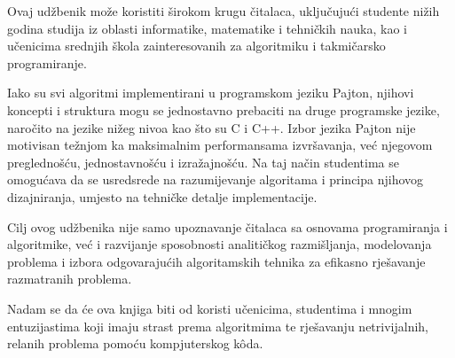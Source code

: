 \documentclass[b5paper, utf8, 11pt, colorlinks]{book}
\begin{document}
Ovaj udžbenik može koristiti širokom krugu čitalaca, uključujući studente nižih godina studija iz oblasti informatike, matematike i tehničkih nauka, kao i učenicima srednjih škola zainteresovanih za algoritmiku i takmičarsko programiranje.

Iako su svi algoritmi implementirani u programskom jeziku Pajton, njihovi koncepti i struktura mogu se jednostavno prebaciti na druge programske jezike, naročito na jezike nižeg nivoa kao što su C i C++. Izbor jezika Pajton nije motivisan težnjom ka maksimalnim performansama izvršavanja, već njegovom preglednošću, jednostavnošću i izražajnošću. Na taj način studentima se omogućava da se usredsrede na razumijevanje algoritama i principa njihovog dizajniranja, umjesto na tehničke detalje implementacije.

Cilj ovog udžbenika nije samo upoznavanje čitalaca sa osnovama programiranja i algoritmike, već i razvijanje sposobnosti analitičkog razmišljanja, modelovanja problema i izbora odgovarajućih algoritamskih tehnika za efikasno rješavanje razmatranih problema. 

Nadam se da će ova knjiga biti od koristi učenicima, studentima i mnogim entuzijastima koji imaju strast prema algoritmima te rješavanju netrivijalnih, relanih problema pomoću kompjuterskog k\^oda.  




 
\end{document}
